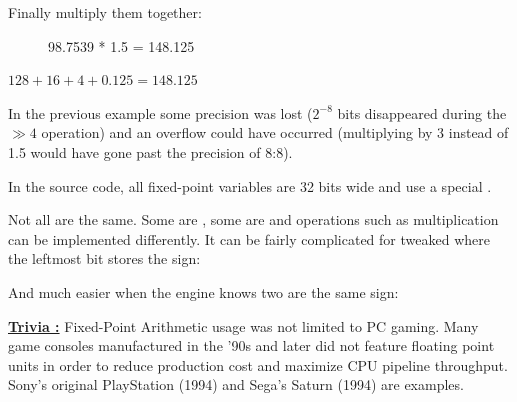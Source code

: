 Finally multiply them together:

\begin{figure}[H]
 \centering
   
   \caption{98.7539 * 1.5 = 148.125} 
\end{figure} 
$128 + 16 + 4 + 0.125 = 148.125 $\\
\par
In the previous example some precision was lost ($ 2^{-8}$ bits disappeared during the $\gg 4$ operation) and an overflow could have occurred (multiplying by 3 instead of 1.5 would have gone past the precision of 8:8).\\
\par
In the source code, all fixed-point variables are 32 bits wide and use a special .\\
\par
\begin{minipage}{\textwidth}
 
 \end{minipage}
\par
Not all  are the same. Some are , some are  and operations such as multiplication can be implemented differently. It can be fairly complicated for tweaked  where the leftmost bit stores the sign:\\
\par
\begin{minipage}{\textwidth}
 
 \end{minipage}
\par
\vspace{10pt}
And much easier when the engine knows two  are the same sign:\\

\par
\begin{minipage}{\textwidth}
 
 \end{minipage}
\par
\vspace{10pt}
 \textbf{\underline{Trivia :}}  Fixed-Point Arithmetic usage was not limited to PC gaming. Many game consoles manufactured in the '90s and later did not feature floating point units in order to reduce production cost and maximize CPU pipeline throughput. Sony's original PlayStation (1994) and Sega's Saturn (1994) are examples.
 

